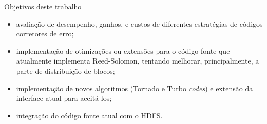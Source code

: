   \begin{frame}{Objetivos deste trabalho}

  \begin{itemize}
     \item avaliação de desempenho, ganhos, e custos de diferentes
  estratégias de códigos corretores de erro;
     \item implementação de otimizações ou extensões para o código fonte que
  atualmente implementa Reed-Solomon, tentando melhorar,
  principalmente, a parte de distribuição de blocos;
     \item implementação de novos algoritmos (Tornado e Turbo \emph{codes}) e
  extensão da interface atual para aceitá-los;
     \item integração do código fonte atual com o HDFS.
     \end{itemize}
  \end{frame}
